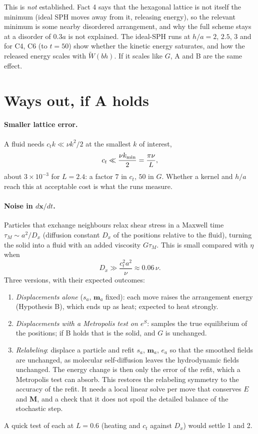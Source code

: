 \documentclass[11pt,aps,preprint,nofootinbib,superscriptaddress,tightenlines]{revtex4-2}
\def\st{\begin{equation}}
\def\stp{\end{equation}}
\let\oldparagraph\paragraph
\renewcommand{\paragraph}{\par\bigskip\oldparagraph}
\begin{document}
This is \emph{not} established.  Fact 4 says that the hexagonal lattice is not itself the
minimum (ideal SPH moves away from it, releasing energy), so the relevant minimum is some
nearby disordered arrangement, and why the full scheme stays at a disorder of $0.3a$ is not
explained.  The ideal-SPH runs at $h/a=2$, $2.5$, $3$ and for C4, C6 (to $t=50$) show whether
the kinetic energy saturates, and how the released energy scales with $\tilde W(bh)$.  If it
scales like $G$, A and B are the same effect.

\section{Ways out, if A holds}
\label{sec:ways}

\paragraph{Smaller lattice error.}  A fluid needs $c_tk\ll\nu k^2/2$ at the smallest $k$ of
interest,
\st
c_t\ll\frac{\nu k_{\rm min}}{2}=\frac{\pi\nu}{L},
\stp
about $3\times10^{-3}$ for $L=2.4$: a factor $7$ in $c_t$, $50$ in $G$.  Whether a kernel and
$h/a$ reach this at acceptable cost is what the runs measure.

\paragraph{Noise in $d\bm x/dt$.}  Particles that exchange neighbours relax shear stress in a
Maxwell time $\tau_M\sim a^2/D_x$ (diffusion constant $D_x$ of the positions relative to the
fluid), turning the solid into a fluid with an added viscosity $G\tau_M$.  This is small
compared with $\eta$ when
\st
D_x\gg\frac{c_t^2a^2}{\nu}\approx0.06\,\nu .
\stp
Three versions, with their expected outcomes:
\begin{enumerate}
\item \emph{Displacements alone} ($s_a$, $\bm m_a$ fixed): each move raises the arrangement
  energy (Hypothesis B), which ends up as heat; expected to heat strongly.
\item \emph{Displacements with a Metropolis test on $e^{S}$}: samples the true equilibrium of
  the positions; if B holds that is the solid, and $G$ is unchanged.
\item \emph{Relabeling}: displace a particle and refit $s_a$, $\bm m_a$, $e_a$ so that the
  smoothed fields are unchanged, as molecular self-diffusion leaves the hydrodynamic fields
  unchanged.  The energy change is then only the error of the refit, which a Metropolis test
  can absorb.  This restores the relabeling symmetry to the accuracy of the refit.  It needs a
  local linear solve per move that conserves $E$ and $\bm M$, and a check that it does not
  spoil the detailed balance of the stochastic step.
\end{enumerate}
A quick test of each at $L=0.6$ (heating and $c_t$ against $D_x$) would settle 1 and 2.
\end{document}
